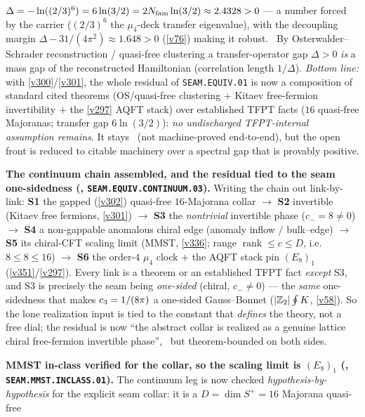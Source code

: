$\Delta=-\ln((2/3)^6)=6\ln(3/2)=2N_{\mathrm{fam}}\ln(3/2)\approx2.4328>0$ --- a number forced by the carrier ($(2/3)^6$ the
$\mu_4$-deck transfer eigenvalue), with the decoupling margin $\Delta-31/(4\pi^2)\approx1.648>0$ (\vref{v76})
making it robust. \mC\ By Osterwalder--Schrader reconstruction / quasi-free clustering a transfer-operator gap
$\Delta>0$ \emph{is} a mass gap of the reconstructed Hamiltonian (correlation length $1/\Delta$). \emph{Bottom
line:} with \vref{v300}/\vref{v301}, the whole residual of \texttt{SEAM.EQUIV.01} is now a composition of standard
cited theorems (OS/quasi-free clustering $+$ Kitaev free-fermion invertibility $+$ the \vref{v297} AQFT stack)
over established TFPT facts ($16$ quasi-free Majoranas; transfer gap $6\ln(3/2)$): \emph{no undischarged
TFPT-internal assumption remains}. It stays \mO\ (not machine-proved end-to-end), but the open front is reduced
to citable machinery over a spectral gap that is provably positive.
\par\smallskip\noindent\textbf{The continuum chain assembled, and the residual tied to the seam one-sidedness
(, \texttt{SEAM.EQUIV.CONTINUUM.03}).} Writing the chain out
link-by-link: \textbf{S1} the gapped (\vref{v302}) quasi-free $16$-Majorana collar $\to$ \textbf{S2} invertible
(Kitaev free fermions, \vref{v301}) $\to$ \textbf{S3} the \emph{nontrivial} invertible phase ($c_-=8\neq0$) $\to$
\textbf{S4} a non-gappable anomalous chiral edge (anomaly inflow / bulk--edge) $\to$ \textbf{S5} its chiral-CFT
scaling limit (MMST, \vref{v336}; range $\operatorname{rank}\le c\le D$, i.e.\ $8\le8\le16$) $\to$ \textbf{S6} the
order-$4$ $\mu_4$ clock $+$ the AQFT stack pin $(E_8)_1$ (\vref{v351}/\vref{v297}). Every link is a theorem or an
established TFPT fact \emph{except} S3, and S3 is precisely the seam being \emph{one-sided} (chiral, $c_-\neq0$) ---
the \emph{same} one-sidedness that makes $c_3=1/(8\pi)$ a one-sided Gauss--Bonnet ($|\mathbb Z_2|\oint K$, \vref{v58}).
So the lone realization input is tied to the constant that \emph{defines} the theory, not a free dial; the residual
is now ``the abstract collar is realized as a genuine lattice chiral free-fermion invertible phase'', \mO\ but
theorem-bounded on both sides.
\par\smallskip\noindent\textbf{MMST in-class verified for the collar, so the scaling limit is $(E_8)_1$
(, \texttt{SEAM.MMST.INCLASS.01}).} The continuum leg is now checked
\emph{hypothesis-by-hypothesis} for the explicit seam collar: it is a $D{=}\dim S^+{=}16$ Majorana quasi-free

